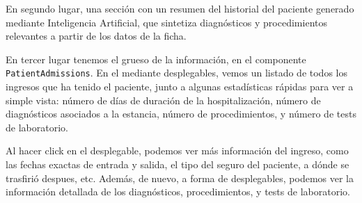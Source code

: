 En segundo lugar, una sección con un resumen del historial del paciente generado mediante Inteligencia Artificial, que sintetiza diagnósticos y procedimientos relevantes a partir de los datos de la ficha.

En tercer lugar tenemos el grueso de la información, en el componente \texttt{PatientAdmissions}. En el mediante desplegables, vemos un listado de todos los ingresos que ha tenido el paciente, junto a algunas estadísticas rápidas para ver a simple vista: número de días de duración de la hospitalización, número de diagnósticos asociados a la estancia, número de procedimientos, y número de tests de laboratorio. 

Al hacer click en el desplegable, podemos ver más información del ingreso, como las fechas exactas de entrada y salida, el tipo del seguro del paciente, a dónde se trasfirió despues, etc. Además, de nuevo, a forma de desplegables, podemos ver la información detallada de los diagnósticos, procedimientos, y tests de laboratorio.

